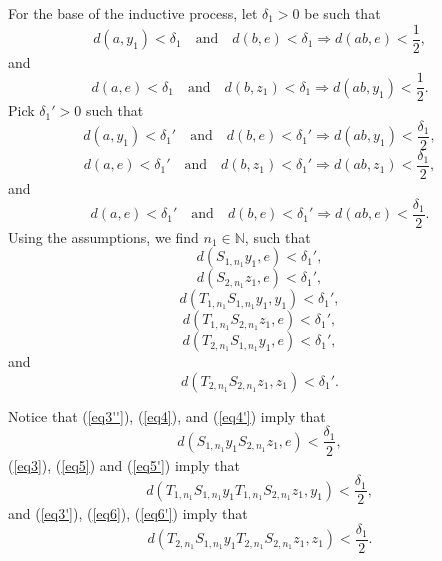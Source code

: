 \documentclass[12pt,a4paper]{amsart}
\theoremstyle{plain}
\theoremstyle{definition}
\theoremstyle{remark}
\theoremstyle{fact}
\begin{document}
    For the base of the inductive process, let $\delta_1>0$ be such that
    \begin{equation}\label{eq1}
        d(a,y_1)<\delta_1 \quad \text{and} \quad d(b,e)<\delta_1 \Rightarrow d(ab,e)<\frac{1}{2},
    \end{equation}
    and
    \begin{equation}\label{eq2}
        d(a,e)<\delta_1 \quad \text{and} \quad d(b,z_1)<\delta_1 \Rightarrow d(ab,y_1)<\frac{1}{2}.
    \end{equation}
    Pick $\delta_1'>0$ such that
    \begin{equation}\label{eq3}
        d(a,y_1)<\delta_1' \quad \text{and} \quad d(b,e)<\delta_1' \Rightarrow d(ab,y_1)<\frac{\delta_1}{2},
    \end{equation}
    \begin{equation}\label{eq3'}
        d(a,e)<\delta_1' \quad \text{and} \quad d(b,z_1)<\delta_1' \Rightarrow d(ab,z_1)<\frac{\delta_1}{2},
    \end{equation}
    and
     \begin{equation}\label{eq3''}
        d(a,e)<\delta_1' \quad \text{and} \quad d(b,e)<\delta_1' \Rightarrow d(ab,e)<\frac{\delta_1}{2}.
    \end{equation}
    Using the assumptions, we find $n_1\in \mathbb{N}$, such that
    \begin{equation}\label{eq4}
        d(S_{1, n_1}y_1,e)<\delta_1',
    \end{equation}
    \begin{equation}\label{eq4'}
       d(S_{2, n_1}z_1,e)<\delta_1', 
    \end{equation}
    \begin{equation}\label{eq5}
       d(T_{1, n_1}S_{1, n_1}y_1,y_1)<\delta_1',   
    \end{equation}
    \begin{equation}\label{eq5'}
      d(T_{1, n_1}S_{2, n_1}z_1,e)<\delta_1',       
    \end{equation}
    \begin{equation}\label{eq6}
          d(T_{2, n_1}S_{1, n_1}y_1,e)<\delta_1',
    \end{equation}
    and
    \begin{equation}\label{eq6'}
      d(T_{2, n_1}S_{2, n_1}z_1,z_1)<\delta_1'.  
    \end{equation}

    Notice that (\ref{eq3''}), (\ref{eq4}), and  (\ref{eq4'}) imply that
    \begin{equation}\label{eq7}
        d(S_{1, n_1}y_1S_{2, n_1}z_1,e)<\frac{\delta_1}{2},
    \end{equation}
     (\ref{eq3}), (\ref{eq5}) and (\ref{eq5'}) imply that
    \begin{equation}\label{eq8}
        d(T_{1,n_1}S_{1,n_1}y_1 T_{1,n_1}S_{2,n_1}z_1,y_1)<\frac{\delta_1}{2},
    \end{equation}
   and (\ref{eq3'}), (\ref{eq6}), (\ref{eq6'}) imply that
    \begin{equation}\label{eq9}
        d(T_{2, n_1}S_{1,n_1}y_1 T_{2,n_1}S_{2,n_1}z_1,z_1)<\frac{\delta_1}{2}.
    \end{equation}
    
\end{document}
